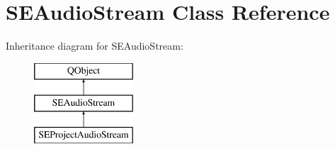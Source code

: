 \hypertarget{class_s_e_audio_stream}{\section{S\+E\+Audio\+Stream Class Reference}
\label{class_s_e_audio_stream}
}
Inheritance diagram for S\+E\+Audio\+Stream\+:\begin{figure}[H]
\begin{center}
\leavevmode
\includegraphics[height=3.000000cm]{class_s_e_audio_stream}
\end{center}
\end{figure}
